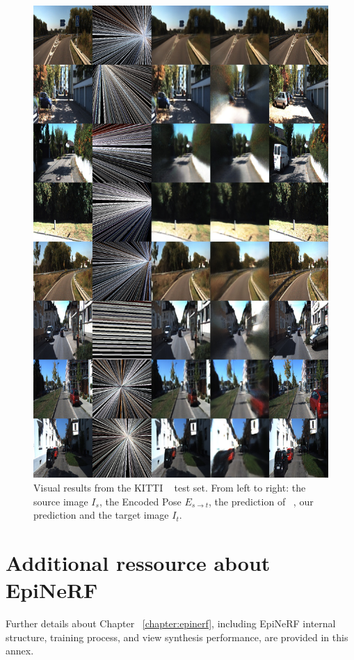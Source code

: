 \begin{figure}[htp!]
    \begin{center}
    \includegraphics[width=.9\textwidth]{images/epipolarnvs/SuppMat_KITTI.jpg}
    \end{center}
     \caption{Visual results from the KITTI ~\cite{KITTI} test set. From left to right: the source image  $I_s$, the Encoded Pose $E_{s\xrightarrow{}t}$,  the prediction of ~\cite{NVS_skip}, our prediction and the target image $I_t$.}
     \label{fig:add_visKITTI}
\end{figure}


\chapter{Additional ressource about EpiNeRF}

Further details about Chapter ~\ref{chapter:epinerf}, including EpiNeRF internal structure, training process, and view synthesis performance, are provided in this annex. 


